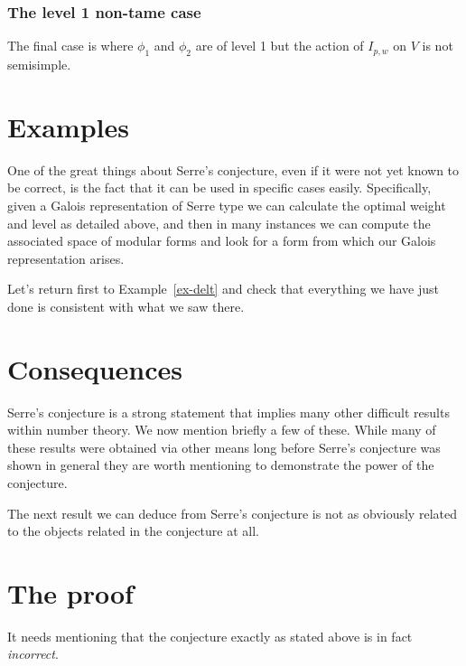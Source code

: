 \documentclass[a4paper,12pt]{article}
\begin{document}
\subsubsection{The level 1 non-tame case}
The final case is where $\phi_1$ and $\phi_2$ are of level 1 but the action of $I_{p,w}$ on $V$ is not semisimple.


\section{Examples}
One of the great things about Serre's conjecture, even if it were not yet known to be correct, is the fact that it can be used in specific cases easily.
Specifically, given a Galois representation of Serre type we can calculate the optimal weight and level as detailed above, and then in many instances we can compute the associated space of modular forms and look for a form from which our Galois representation arises.

\begin{ex}
Let's return first to Example~\ref{ex-delt} and check that everything we have just done is consistent with what we saw there.
\end{ex}

\section{Consequences}
Serre's conjecture is a strong statement that implies many other difficult results within number theory.
We now mention briefly a few of these.
While many of these results were obtained via other means long before Serre's conjecture was shown in general they are worth mentioning to demonstrate the power of the conjecture.

The next result we can deduce from Serre's conjecture is not as obviously related to the objects related in the conjecture at all.

\section{The proof}
It needs mentioning that the conjecture exactly as stated above is in fact \emph{incorrect}.




\end{document}
